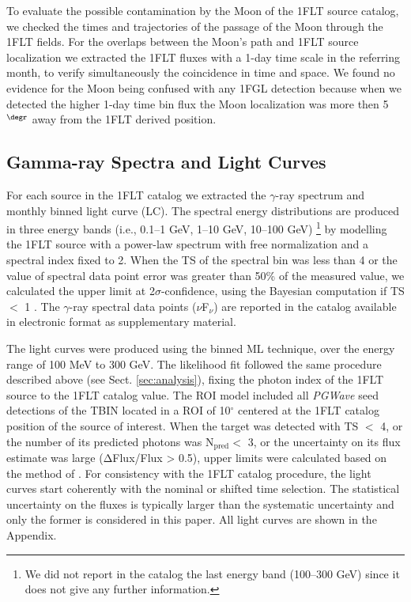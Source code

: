 \documentclass{aastex62}
\begin{document}
To evaluate the possible contamination by the Moon of the 1FLT source catalog, we checked the times and trajectories of the passage of the Moon through the 1FLT fields. For the overlaps between the Moon's path and 1FLT source localization we extracted the 1FLT fluxes with a 1-day time scale in the referring month, to verify simultaneously the coincidence in time and space. 
We found no evidence for the Moon being confused with any 1FGL detection
because when we detected the higher 1-day time bin flux the Moon localization was more then 5$^{\degr}$ away from the 1FLT derived position.



\subsection{Gamma-ray Spectra and Light Curves}\label{sec:SEDLC} 

For each source in the 1FLT catalog we extracted the $\gamma$-ray spectrum and monthly binned light curve (LC). The spectral energy distributions are produced in three energy bands (i.e., 0.1--1 GeV, 1--10 GeV, 10--100 GeV) \footnote{We did not report in the catalog the last energy band (100--300 GeV) since it does not give any further information.} by modelling the 1FLT source with a power-law spectrum with free normalization and a spectral index fixed to 2. 
When the TS of the spectral bin was less than 4 or the value of spectral data point error was greater than 50\% of the measured value, we calculated the upper limit at 2$\sigma$-confidence, using the Bayesian computation if TS $<$ 1 \citep{helene1984errors}.
The $\gamma$-ray spectral data points ($\nu$F$_\nu$) are reported in the catalog available in electronic format as supplementary material.

The light curves were produced using the binned ML technique, over the energy range of 100 MeV to 300 GeV. The likelihood fit followed the same procedure described above (see Sect. \ref{sec:analysis}), fixing the photon index of the 1FLT source to the 1FLT catalog value. 
The  ROI model included all \textit{PGWave} seed detections of the TBIN located in a ROI of 10$^\circ$ centered at the 1FLT catalog position of the source of interest. When the target was detected with TS $<$ 4, or the number of its predicted photons was N$\mathrm{_{pred}<}$ 3, or the uncertainty on its flux estimate was large ($\mathrm{\Delta}$Flux/Flux > 0.5), upper limits were calculated based on the method of \citet{helene1984errors}.
For consistency with the 1FLT catalog procedure, the light curves start coherently with the nominal or shifted time selection. The statistical uncertainty on the fluxes is typically larger than the systematic uncertainty \citep{ackermann2012fermi} and only the former is considered in this paper. All light curves are shown in the Appendix.
\end{document}
